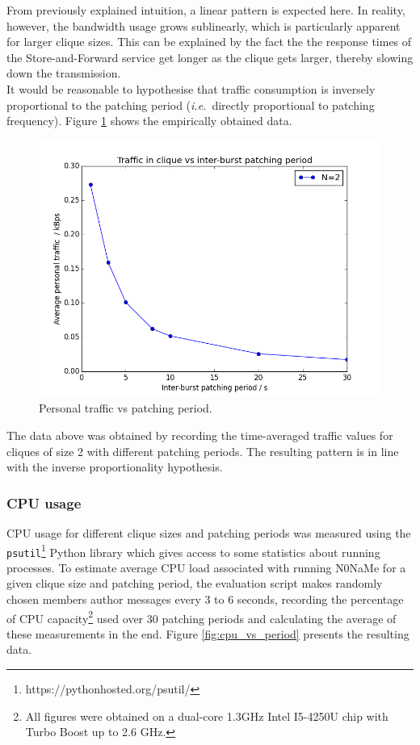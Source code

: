 \documentclass[a4paper, twoside, 12pt]{report}
\newcommand{\funkytt}{\fontfamily{AnonymousPro}\selectfont}
\begin{document}
From previously explained intuition, a linear pattern is expected here. In reality, however, the bandwidth usage grows sublinearly, which is particularly apparent for larger clique sizes. This can be explained by the fact the the response times of the Store-and-Forward service get longer as the clique gets larger, thereby slowing down the transmission. \\

It would be reasonable to hypothesise that traffic consumption is inversely proportional to the patching period (\textit{i.e.}~directly proportional to patching frequency). Figure \ref{fig:traf_vs_period} shows the empirically obtained data.


\begin{figure}[H]
    \captionsetup{width=0.9\textwidth}
    \centering
    \includegraphics[width=0.60\linewidth]{pics/eval/traf_vs_period.png}
    \caption{\label{fig:traf_vs_period} Personal traffic vs patching period.}
\end{figure}

The data above was obtained by recording the time-averaged traffic values for cliques of size 2 with different patching periods. The resulting pattern is in line with the inverse proportionality hypothesis.

\subsubsection{CPU usage}
CPU usage for different clique sizes and patching periods was measured using the \texttt{psutil}\footnote{https://pythonhosted.org/psutil/} Python library which gives access to some statistics about running processes. To estimate average CPU load associated with running {\funkytt N0NaMe} for a given clique size and patching period, the evaluation script makes randomly chosen members author messages every 3 to 6 seconds, recording the percentage of CPU capacity\footnote{All figures were obtained on a dual-core 1.3GHz Intel I5-4250U chip with Turbo Boost up to 2.6 GHz.} used over 30 patching periods and calculating the average of these measurements in the end. Figure \ref{fig:cpu_vs_period} presents the resulting data. \\
\end{document}
